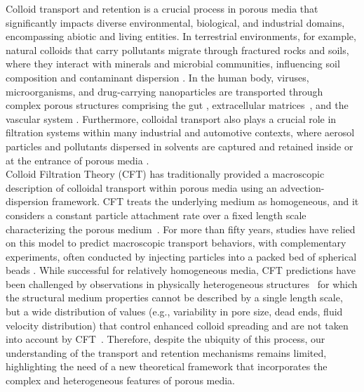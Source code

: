 \documentclass[singlecolumn,pre,notitlepage,preprintnumbers,floatfix,superscriptaddress]{revtex4-1}
\begin{document}
\noindent
Colloid transport and retention is a crucial process in porous media that significantly impacts diverse environmental, biological, and industrial domains, encompassing abiotic and living entities. In terrestrial environments, for example, natural colloids that carry pollutants migrate through fractured rocks and soils, where they interact with minerals and microbial communities, influencing soil composition and contaminant dispersion \cite{bradford_transport_2013,grolimund_1996}. In the human body, viruses, microorganisms, and drug-carrying nanoparticles are transported through complex porous structures comprising the gut \cite{ejazi_mechanisms_2023,scheidweiler_spatial_2024}, extracellular matrices~\cite{malandrino_complex_2018}, and the vascular system \cite{blanco_principles_2015,corliss_methods_2019,jafarnejad_quantification_2019}. Furthermore, colloidal transport also plays a crucial role in filtration systems within many industrial and automotive contexts, where aerosol particles and pollutants dispersed in solvents are captured and retained inside or at the entrance of porous media \cite{tcharkhtchi_overview_2021,bradford2015determining}.\\

 \noindent
Colloid Filtration Theory (CFT) has traditionally provided a macroscopic description of colloidal transport within porous media using an advection-dispersion framework. CFT treats the underlying medium as homogeneous, and it considers a constant particle attachment rate over a fixed length scale characterizing the porous medium~\cite{Nelson2007,GinnLang2005}. For more than fifty years, studies have relied on this model to predict macroscopic transport behaviors, with complementary experiments, often conducted by injecting particles into a packed bed of spherical beads \cite{Happel1958}. While successful for relatively homogeneous media, CFT predictions have been challenged by observations in physically heterogeneous structures~\cite{Cortis1,Tuf_Elim2_2004, tufenkji2005breakdown} for which the structural medium properties cannot be described by a single length scale, but a wide distribution of values (e.g., variability in pore size, dead ends, fluid velocity distribution) that control enhanced colloid spreading and are not taken into account by CFT~\cite{redman_pathogen_2001}. Therefore, despite the ubiquity of this process, our understanding of the transport and retention mechanisms remains limited, highlighting the need of a new theoretical framework that incorporates the complex and heterogeneous features of porous media. \\
\end{document}
